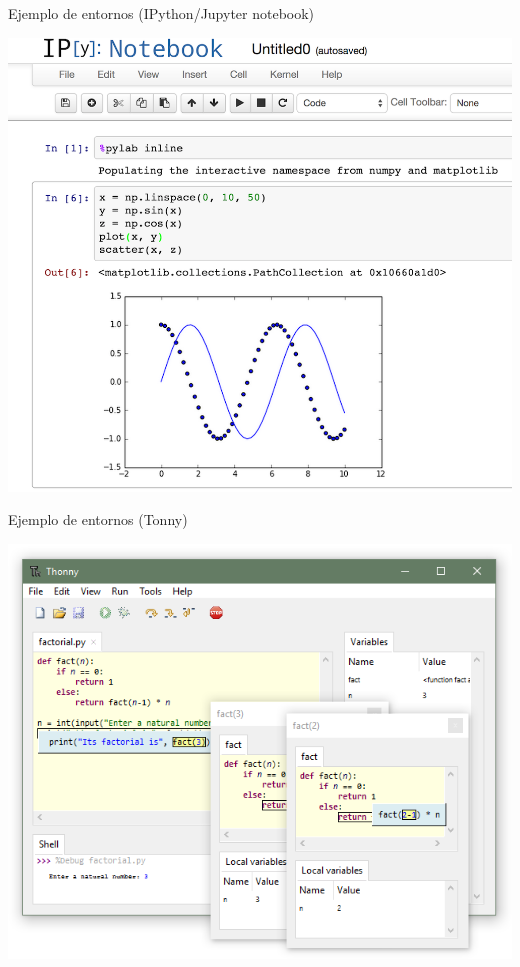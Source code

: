 \documentclass[bigger,unknownkeysallowed]{beamer}
\begin{document}
\begin{frame}[label={sec:org89aa04c}]{Ejemplo de entornos (IPython/Jupyter notebook)}
\begin{center}
\includegraphics[width=.8\textwidth]{notebook2.png}
\end{center}
\end{frame}


\begin{frame}[label={sec:orga8fc3de}]{Ejemplo de entornos (Tonny)}
\begin{center}
\includegraphics[width=.8\textwidth]{tonny.png}
\end{center}
\end{frame}
\end{document}
